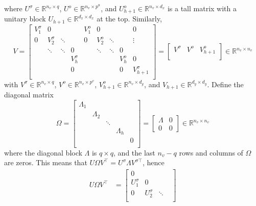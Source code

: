 \documentclass{article}
\makeatletter
\renewenvironment{proof}[1][\proofname]{
  \par\pushQED{\qed}\normalfont
  \topsep6\p@\@plus6\p@\relax
  \trivlist\item[\hskip\labelsep\bfseries#1\@addpunct{.}]
  \ignorespaces
}{
  \popQED\endtrivlist\@endpefalse
}
\newcommand{\1}{\mathds{1}}
\makeatother
\begin{document}
\begin{proof}
where $U^\sigma\in\mathbb{R}^{n_v\times q}$, $U^o\in\mathbb{R}^{n_v\times p^u}$, and $U_{h+1}^o\in\mathbb{R}^{n_v\times d_x}$ is a tall matrix with a unitary block $U_{h+1}\in\mathbb{R}^{d_x\times d_x}$ at the top. Similarly,
\begin{equation}
	V = 
	\left[
	\begin{array}{cccc|cccc|c}
		V_1^{\sigma} & 0 & & & V_{1}^o & 0 & & & 0 \\
		0 & V_2^{\sigma} & \ddots & & 0 & V_{2}^o & \ddots & & \vdots\\
		& \ddots & \ddots & 0 & & \ddots & \ddots & 0 & \\
		& & & V_{h}^{\sigma} & & & & V_{h}^{o} & 0 \\
		& & & 0 & & & & 0 & V_{h+1}^{\sigma} \\
	\end{array}
	\right] = \left[
	\begin{array}{c|c|c}
		V^\sigma & V^o & V_{h+1}^o \\
	\end{array}
	\right] \in\mathbb{R}^{n_v\times n_v}
    \label{eq:svd_V}
\end{equation}
with  $V^\sigma\in\mathbb{R}^{n_v\times q}$, $V^o\in\mathbb{R}^{n_v\times p^v}$, $V_{h+1}^o\in\mathbb{R}^{n_v\times d_y}$, and $V_{h+1}\in\mathbb{R}^{d_y\times d_y}$. Define the diagonal matrix
\begin{equation}\label{eq:svddiag}
	\Omega = \begin{bmatrix}
		\Lambda_1 & & & & \\
		& \Lambda_2 & & & \\
		& & \ddots & & \\
		& & & \Lambda_h & \\
		& & & & 0 \\
	\end{bmatrix} = \begin{bmatrix}
	\Lambda & 0 \\
	0 & 0
	\end{bmatrix} \in\mathbb{R}^{n_v\times n_v}
\end{equation}
where the diagonal block $\Lambda$ is $q\times q$, and the last $n_v-q$ rows and columns of $\Omega$ are zeros. This means that $U\Omega V^\top  = U^\sigma \Lambda V^{\sigma \top}$, hence
\begin{align}
	U\Omega V^\top  & = \begin{bmatrix}
		0 & & & \\
		U_1^\sigma & 0 & & \\
		0 & U_2^\sigma & \ddots & \\

\end{bmatrix}
\end{align}
\end{proof}
\end{document}
